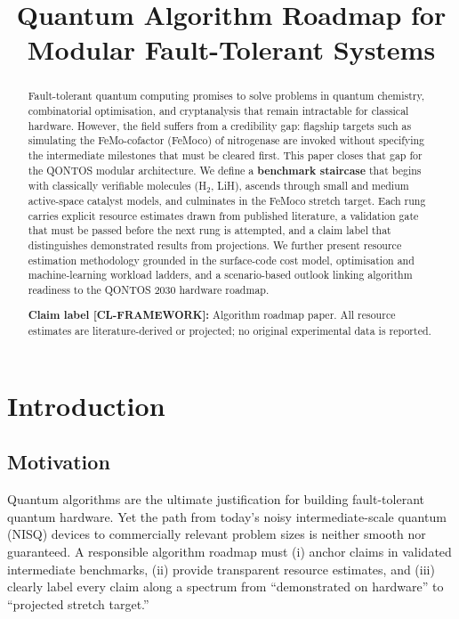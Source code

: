 \documentclass[conference]{IEEEtran}
\begin{document}
\title{Quantum Algorithm Roadmap for Modular Fault-Tolerant Systems}
\author{\qontosauthor}
\maketitle

\begin{abstract}
Fault-tolerant quantum computing promises to solve problems in quantum chemistry,
combinatorial optimisation, and cryptanalysis that remain intractable for classical
hardware. However, the field suffers from a credibility gap: flagship targets such as
simulating the FeMo-cofactor (FeMoco) of nitrogenase are invoked without specifying
the intermediate milestones that must be cleared first. This paper closes that gap for
the QONTOS modular architecture. We define a \textbf{benchmark staircase} that begins with
classically verifiable molecules (H$_2$, LiH), ascends through small and medium
active-space catalyst models, and culminates in the FeMoco stretch target. Each rung
carries explicit resource estimates drawn from published literature, a validation gate
that must be passed before the next rung is attempted, and a claim label that
distinguishes demonstrated results from projections. We further present resource
estimation methodology grounded in the surface-code cost model, optimisation and
machine-learning workload ladders, and a scenario-based outlook linking algorithm
readiness to the QONTOS 2030 hardware roadmap.

\textbf{Claim label [CL-FRAMEWORK]:} Algorithm roadmap paper. All resource estimates are
literature-derived or projected; no original experimental data is reported.
\end{abstract}

\section{Introduction}

\subsection{Motivation}

Quantum algorithms are the ultimate justification for building fault-tolerant quantum
hardware. Yet the path from today's noisy intermediate-scale quantum (NISQ) devices to
commercially relevant problem sizes is neither smooth nor guaranteed. A responsible
algorithm roadmap must (i) anchor claims in validated intermediate benchmarks, (ii)
provide transparent resource estimates, and (iii) clearly label every claim along a
spectrum from ``demonstrated on hardware'' to ``projected stretch target.''
\end{document}
